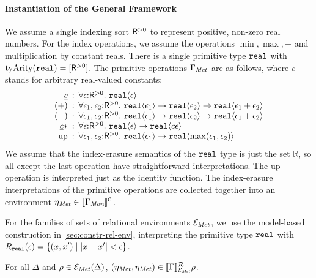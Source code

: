 \paragraph{Instantiation of the General Framework}
We assume a single indexing sort $\mathsf{R}^{>0}$ %
to represent positive, non-zero real numbers. For the index
operations, we assume the operations $\min, \max, +$ and
multiplication by constant reals. There is a single primitive type
$\textup{\texttt{real}}$ with $\mathrm{tyArity}(\textup{\texttt{real}}) =
[\mathsf{R}^{>0}]$. The primitive operations $\Gamma_{\mathit{Met}}$ are as
follows, where $c$ stands for arbitrary real-valued constants:
\begin{displaymath}
  \begin{array}{r@{\hspace{0.5em}:\hspace{0.5em}}l}
    \underline{c} & \forall \epsilon\mathord:\metricSort.\ \tyPrim{real}{\epsilon} \\
    (+) & \forall \epsilon_1, \epsilon_2\mathord:\metricSort.\ \tyPrim{real}{\epsilon_1} \to \tyPrim{real}{\epsilon_2} \to \tyPrim{real}{\epsilon_1 + \epsilon_2} \\
    (-) & \forall \epsilon_1, \epsilon_2\mathord:\metricSort.\ \tyPrim{real}{\epsilon_1} \to \tyPrim{real}{\epsilon_2} \to \tyPrim{real}{\epsilon_1 + \epsilon_2} \\
    \underline{c} * & \forall \epsilon\mathord:\metricSort.\ \tyPrim{real}{\epsilon} \to \tyPrim{real}{c\epsilon} \\
    \mathrm{up} & \forall \epsilon_1,\epsilon_2\mathord:\metricSort.\ \tyPrim{real}{\epsilon_1} \to \tyPrim{real}{\max(\epsilon_1,\epsilon_2)}
  \end{array}
\end{displaymath}
We assume that the index-erasure semantics of the $\textup{\texttt{real}}$
type is just the set $\mathbb{R}$, so all except the last operation
have straightforward interpretations. The $\mathrm{up}$ operation is
interpreted just as the identity function. The index-erasure
interpretations of the primitive operations are collected together
into an environment $\eta_{\mathit{Met}} \in \llbracket \Gamma_{\textit{Mon}} \rrbracket^{\mathcal{C}}$.

For the families of sets of relational environments
$\mathcal{E}_{\mathit{Met}}$, we use the model-based construction in
\autoref{sec:constr-rel-env}, interpreting the primitive type
$\textup{\texttt{real}}$ with $R_{\textup{\texttt{real}}}(\epsilon) = \{ (x,x')
\mathrel| |x - x'| < \epsilon\}$.
\begin{lemma}\label{lem:metric-environments}
  For all $\Delta$ and $\rho \in \mathcal{E}_{\mathit{Met}}(\Delta)$,
  $(\eta_{\mathit{Met}}, \eta_{\mathit{Met}}) \in
  \llbracket \Gamma \rrbracket^{\mathcal{R}}_{\mathcal{E}_{\mathit{Met}}}{\rho}$.
\end{lemma}

